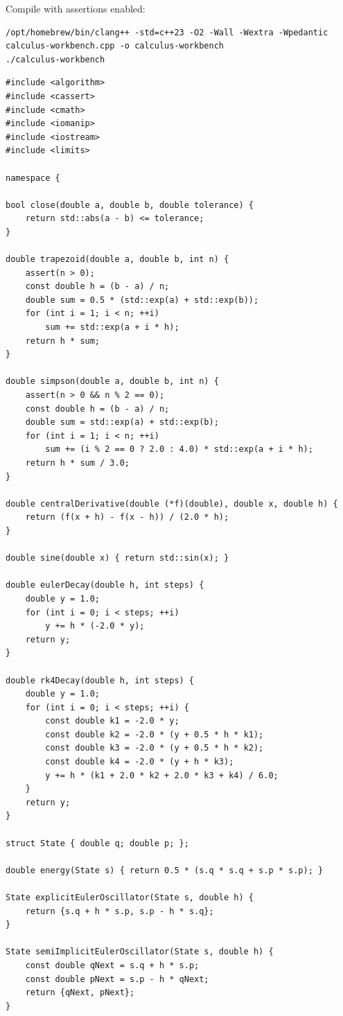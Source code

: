 Compile with assertions enabled:

\begin{verbatim}
/opt/homebrew/bin/clang++ -std=c++23 -O2 -Wall -Wextra -Wpedantic calculus-workbench.cpp -o calculus-workbench
./calculus-workbench
\end{verbatim}

\begin{verbatim}
#include <algorithm>
#include <cassert>
#include <cmath>
#include <iomanip>
#include <iostream>
#include <limits>

namespace {

bool close(double a, double b, double tolerance) {
    return std::abs(a - b) <= tolerance;
}

double trapezoid(double a, double b, int n) {
    assert(n > 0);
    const double h = (b - a) / n;
    double sum = 0.5 * (std::exp(a) + std::exp(b));
    for (int i = 1; i < n; ++i)
        sum += std::exp(a + i * h);
    return h * sum;
}

double simpson(double a, double b, int n) {
    assert(n > 0 && n % 2 == 0);
    const double h = (b - a) / n;
    double sum = std::exp(a) + std::exp(b);
    for (int i = 1; i < n; ++i)
        sum += (i % 2 == 0 ? 2.0 : 4.0) * std::exp(a + i * h);
    return h * sum / 3.0;
}

double centralDerivative(double (*f)(double), double x, double h) {
    return (f(x + h) - f(x - h)) / (2.0 * h);
}

double sine(double x) { return std::sin(x); }

double eulerDecay(double h, int steps) {
    double y = 1.0;
    for (int i = 0; i < steps; ++i)
        y += h * (-2.0 * y);
    return y;
}

double rk4Decay(double h, int steps) {
    double y = 1.0;
    for (int i = 0; i < steps; ++i) {
        const double k1 = -2.0 * y;
        const double k2 = -2.0 * (y + 0.5 * h * k1);
        const double k3 = -2.0 * (y + 0.5 * h * k2);
        const double k4 = -2.0 * (y + h * k3);
        y += h * (k1 + 2.0 * k2 + 2.0 * k3 + k4) / 6.0;
    }
    return y;
}

struct State { double q; double p; };

double energy(State s) { return 0.5 * (s.q * s.q + s.p * s.p); }

State explicitEulerOscillator(State s, double h) {
    return {s.q + h * s.p, s.p - h * s.q};
}

State semiImplicitEulerOscillator(State s, double h) {
    const double qNext = s.q + h * s.p;
    const double pNext = s.p - h * qNext;
    return {qNext, pNext};
}


\end{verbatim}
